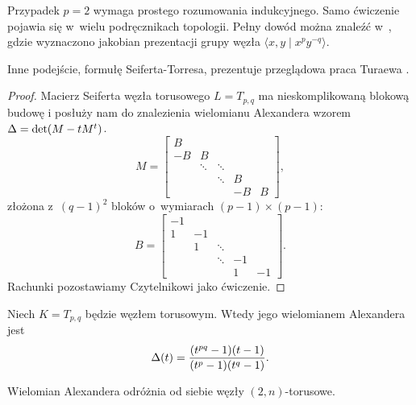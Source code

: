 Przypadek $p = 2$ wymaga prostego rozumowania indukcyjnego.
Samo ćwiczenie pojawia się w~wielu podręcznikach topologii.
Pełny dowód można znaleźć w~\cite[przykład 9.15]{burde14}, gdzie wyznaczono jakobian prezentacji grupy węzła $\langle x, y \mid x^py^{-q}\rangle$.

Inne podejście, formułę Seiferta-Torresa, prezentuje przeglądowa praca Turaewa \cite{turaev86}.

\begin{proof}
    Macierz Seiferta węzła torusowego $L = T_{p, q}$ ma nieskomplikowaną blokową budowę i posłuży nam do znalezienia wielomianu Alexandera wzorem $\Delta = \det (M - tM^t)$.
    \begin{equation}
        M = \begin{bmatrix}
            B & & & & \\
            -B & B & & & \\
            & \ddots & \ddots & & \\
            & & \ddots & B & \\
            & & & -B & B
        \end{bmatrix},
    \end{equation}
    złożona z~$(q-1)^2$ bloków o~wymiarach $(p-1) \times (p-1)$:
    \begin{equation}
        B = \begin{bmatrix}
            -1 & & & & \\
            1 & -1 & & & \\
            & 1 & \ddots & & \\
            & & \ddots & -1 & \\
            & & & 1 & -1
        \end{bmatrix}.
    \end{equation}
    Rachunki pozostawiamy Czytelnikowi jako ćwiczenie.
\end{proof}

\begin{corollary}
    Niech $K = T_{p, q}$ będzie węzłem torusowym.
    Wtedy jego wielomianem Alexandera jest
    \begin{equation}
         \Delta(t) = \frac{(t^{pq}-1)(t-1)}{(t^p-1)(t^q-1)}.
    \end{equation}
\end{corollary}

\begin{corollary}
    Wielomian Alexandera odróżnia od siebie węzły $(2,n)$-torusowe.
\end{corollary}

